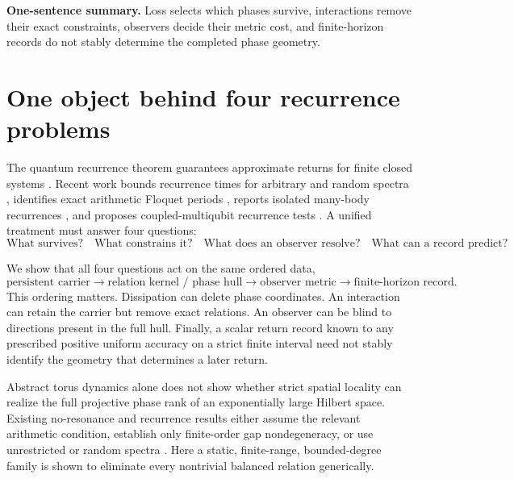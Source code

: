 \documentclass[10pt]{article}
\theoremstyle{definition}
\begin{document}
\noindent\textbf{One-sentence summary.}
Loss selects which phases survive, interactions remove their exact
constraints, observers decide their metric cost, and finite-horizon records
do not stably determine the completed phase geometry.

\section{One object behind four recurrence problems}

The quantum recurrence theorem guarantees approximate returns for finite
closed systems \cite{BocchieriLoinger1957}.  Recent work bounds recurrence
times for arbitrary and random spectra \cite{KotowskiOszmaniec2026,
GuptaShort2026}, identifies exact arithmetic Floquet periods
\cite{AnandEtAl2026}, reports isolated many-body recurrences
\cite{RauerEtAl2018}, and proposes coupled-multiqubit recurrence tests
\cite{KarimiEtAl2026}.  A unified treatment must answer four questions:
\begin{equation}
 \boxed{\text{What survives?}\quad\text{What constrains it?}\quad
 \text{What does an observer resolve?}\quad\text{What can a record predict?}}
 \label{eq:fourquestions}
\end{equation}

We show that all four questions act on the same ordered data,
\begin{equation}
 \text{persistent carrier}
 \longrightarrow
 \text{relation kernel / phase hull}
 \longrightarrow
 \text{observer metric}
 \longrightarrow
 \text{finite-horizon record}.
 \label{eq:pipeline}
\end{equation}
This ordering matters.  Dissipation can delete phase coordinates.  An
interaction can retain the carrier but remove exact relations.  An observer
can be blind to directions present in the full hull.  Finally, a scalar
return record known to any prescribed positive uniform accuracy on a strict
finite interval need not stably identify the geometry that determines a
later return.

Abstract torus dynamics alone does not show whether strict spatial locality
can realize the full projective phase rank of an exponentially large Hilbert
space.  Existing no-resonance and recurrence results either assume the
relevant arithmetic condition, establish only finite-order gap
nondegeneracy, or use unrestricted or random spectra
\cite{Huang2021,RiddellBertini2024,CamposVenutiOdavicHamma2026}.  Here a
static, finite-range, bounded-degree family is shown to eliminate every
nontrivial balanced relation generically.
\end{document}
